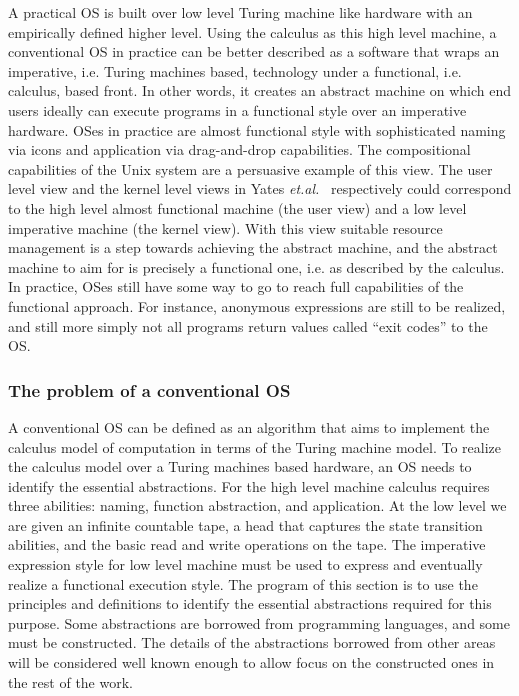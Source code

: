 \documentclass[draft]{article}
\def\etal{{\it et.al.}\ }
\begin{document}
A practical  OS is built over  low level Turing  machine like hardware
with  an  empirically  defined  higher  level.   Using  the  
calculus as this high level machine, a conventional OS in practice can
be  better described  as a  software  that wraps  an imperative,  i.e.
Turing machines based, technology  under a functional, i.e.  
calculus, based front.  In other words, it creates an abstract machine
on which end users ideally  can execute programs in a functional style
over an  imperative hardware.  OSes in practice  are almost functional
style  with  sophisticated  naming   via  icons  and  application  via
drag-and-drop  capabilities.  The  compositional  capabilities of  the
Unix system  are a  persuasive example of  this view.  The  user level
view    and    the    kernel    level    views    in    Yates    \etal
\cite{Yates99i/oautomaton} respectively  could correspond to  the high
level  almost functional  machine  (the  user view)  and  a low  level
imperative  machine  (the  kernel  view).   With  this  view  suitable
resource management is a  step towards achieving the abstract machine,
and the  abstract machine  to aim for  is precisely a  functional one,
i.e.  as described by the  calculus.  In practice, OSes still
have  some way  to go  to reach  full capabilities  of  the functional
approach.  For instance, anonymous   expressions are still to
be  realized, and  still more  simply not  all programs  return values
called ``exit codes'' to the OS.

\subsubsection{The problem of a conventional OS}
\label{sec:usual:os:prob}
\label{sec:os:abstractions}

A  conventional  OS  can be  defined  as  an  algorithm that  aims  to
implement the  calculus model  of computation in terms of the
Turing machine model.  To realize  the  calculus model over a
Turing machines based hardware, an  OS needs to identify the essential
abstractions.  For the high  level machine  calculus requires
three  abilities: naming, function  abstraction, and  application.  At
the low  level we are  given an infinite  countable tape, a  head that
captures the state transition abilities,  and the basic read and write
operations on the tape.  The imperative expression style for low level
machine must  be used to  express and eventually realize  a functional
execution style.  The program of this section is to use the principles
and definitions  to identify  the essential abstractions  required for
this  purpose.   Some   abstractions  are  borrowed  from  programming
languages,  and  some  must   be  constructed.   The  details  of  the
abstractions borrowed  from other areas will be  considered well known
enough to allow focus on the constructed ones in the rest of the work.
\end{document}
